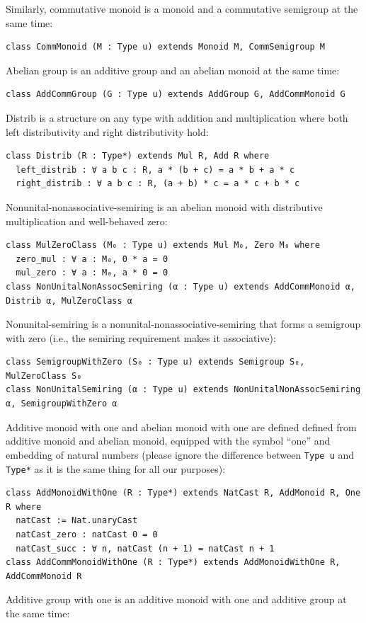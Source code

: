 \documentclass[]{article}
\renewcommand{\.}{\hskip .75pt}
\begin{document}
Similarly, commutative monoid is a monoid and a commutative semigroup at the same time:
\begin{lstlisting}
class CommMonoid (M : Type u) extends Monoid M, CommSemigroup M
\end{lstlisting}
Abelian group is an additive group and an abelian monoid at the same time:
\begin{lstlisting}
class AddCommGroup (G : Type u) extends AddGroup G, AddCommMonoid G
\end{lstlisting}
Distrib is a structure on any type with addition and multiplication where
both left distributivity and right distributivity hold:
\begin{lstlisting}
class Distrib (R : Type*) extends Mul R, Add R where
  left_distrib : ∀ a b c : R, a * (b + c) = a * b + a * c
  right_distrib : ∀ a b c : R, (a + b) * c = a * c + b * c
\end{lstlisting}
Nonunital-nonassociative-semiring is an abelian monoid with distributive multiplication and well-behaved zero:
\begin{lstlisting}
class MulZeroClass (M₀ : Type u) extends Mul M₀, Zero M₀ where
  zero_mul : ∀ a : M₀, 0 * a = 0
  mul_zero : ∀ a : M₀, a * 0 = 0
class NonUnitalNonAssocSemiring (α : Type u) extends AddCommMonoid α, Distrib α, MulZeroClass α
\end{lstlisting}
Nonunital-semiring is a nonunital-nonassociative-semiring that forms a semigroup with zero (i.e., the
semiring requirement makes it associative):
\begin{lstlisting}
class SemigroupWithZero (S₀ : Type u) extends Semigroup S₀, MulZeroClass S₀
class NonUnitalSemiring (α : Type u) extends NonUnitalNonAssocSemiring α, SemigroupWithZero α
\end{lstlisting}
Additive monoid with one and abelian monoid with one are defined defined from additive monoid
and abelian monoid, equipped with the symbol ``one'' and embedding of natural numbers
(please ignore the difference between \texttt{Type u} and \texttt{Type*} as it is the same thing
for all our purposes):
\begin{lstlisting}
class AddMonoidWithOne (R : Type*) extends NatCast R, AddMonoid R, One R where
  natCast := Nat.unaryCast
  natCast_zero : natCast 0 = 0
  natCast_succ : ∀ n, natCast (n + 1) = natCast n + 1 
class AddCommMonoidWithOne (R : Type*) extends AddMonoidWithOne R, AddCommMonoid R
\end{lstlisting}
Additive group with one is an additive monoid with one and additive group at the same time:
\end{document}
